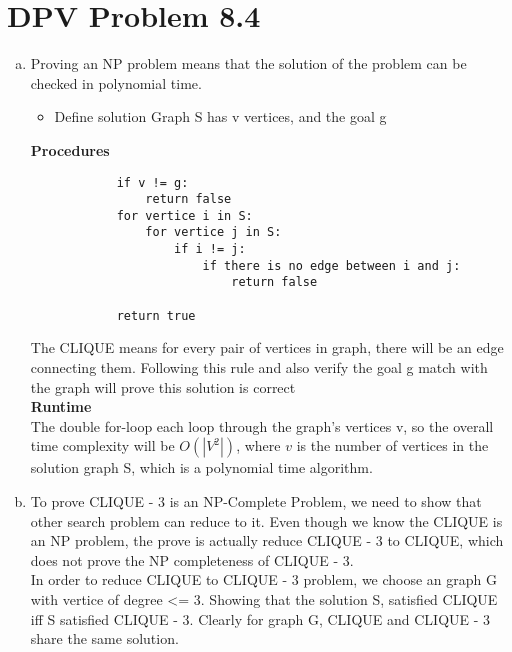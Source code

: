 \documentclass{article}
\def\math#1{$#1$}
\begin{document}
\section{DPV Problem 8.4}
\begin{enumerate}[a)]
    \item Proving an NP problem means that the solution of the problem can be checked in polynomial time. 
        \begin{itemize}
            \item Define solution Graph S has v vertices, and the goal g
        \end{itemize}
        \textbf{Procedures}
        \begin{verbatim}
            if v != g:
                return false
            for vertice i in S:
                for vertice j in S:
                    if i != j:
                        if there is no edge between i and j:
                            return false
            
            return true
        \end{verbatim}
        The CLIQUE means for every pair of vertices in graph, there will be an edge connecting them. Following this rule and also verify the goal g match with the graph will prove this solution is correct \\
        \textbf{Runtime} \\
        The double for-loop each loop through the graph's vertices v, so the overall time complexity will be \math{O(|V^2|)}, where \math{v} is the number of vertices in the solution graph S, which is a polynomial time algorithm.
        \item To prove CLIQUE - 3 is an NP-Complete Problem, we need to show that other search problem can reduce to it. Even though we know the CLIQUE is an NP problem, the prove is actually reduce CLIQUE - 3 to CLIQUE, which does not prove the NP completeness of CLIQUE - 3.  \\
        In order to reduce CLIQUE to CLIQUE - 3 problem, we choose an graph G with vertice of degree <= 3. Showing that the solution S, satisfied CLIQUE iff S satisfied CLIQUE - 3. Clearly for graph G, CLIQUE and CLIQUE - 3 share the same solution.
\end{enumerate}
\end{document}

